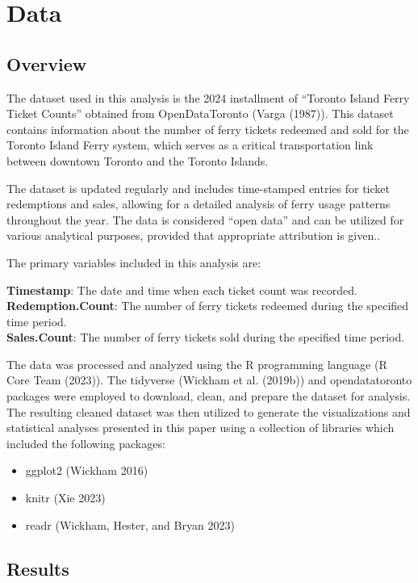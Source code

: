 \documentclass[
  letterpaper,
  DIV=11,
  numbers=noendperiod]{scrartcl}
\providecommand{\tightlist}{%
  \setlength{\itemsep}{0pt}\setlength{\parskip}{0pt}}\usepackage{longtable,booktabs,array}
\begin{document}
\section{Data}\label{sec-data}

\subsection{Overview}\label{sec-data-overview}

The dataset used in this analysis is the 2024 installment of ``Toronto
Island Ferry Ticket Counts'' obtained from OpenDataToronto (Varga
(1987)). This dataset contains information about the number of ferry
tickets redeemed and sold for the Toronto Island Ferry system, which
serves as a critical transportation link between downtown Toronto and
the Toronto Islands.

The dataset is updated regularly and includes time-stamped entries for
ticket redemptions and sales, allowing for a detailed analysis of ferry
usage patterns throughout the year. The data is considered ``open data''
and can be utilized for various analytical purposes, provided that
appropriate attribution is given..

The primary variables included in this analysis are:

\textbf{Timestamp}: The date and time when each ticket count was
recorded.\\
\textbf{Redemption.Count}: The number of ferry tickets redeemed during
the specified time period.\\
\textbf{Sales.Count}: The number of ferry tickets sold during the
specified time period.

The data was processed and analyzed using the R programming language (R
Core Team (2023)). The tidyverse (Wickham et al. (2019b)) and
opendatatoronto packages were employed to download, clean, and prepare
the dataset for analysis. The resulting cleaned dataset was then
utilized to generate the visualizations and statistical analyses
presented in this paper using a collection of libraries which included
the following packages:

\begin{itemize}
\tightlist
\item
  ggplot2 (Wickham 2016)
\item
  knitr (Xie 2023)
\item
  readr (Wickham, Hester, and Bryan 2023)
\end{itemize}

\subsection{Results}\label{sec-data-resultsk}
\end{document}
